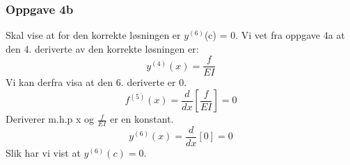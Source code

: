 \subsubsection{Oppgave 4b}
Skal vise at for den korrekte løsningen er $y^{(6)}$(c) = 0. Vi vet fra oppgave 4a at den 4. deriverte av den korrekte løsningen er:
\begin{equation*}
y^{(4)}(x) = \frac{f}{EI}
\end{equation*}
Vi kan derfra visa at den 6. deriverte er 0.
\begin{equation}
f^{(5)}(x) = \frac{d}{dx}[\frac{f}{EI}] = 0
\end{equation}
Deriverer m.h.p x og $\frac{f}{EI}$ er en konstant.
\begin{equation}
y^{(6)}(x) = \frac{d}{dx}[0] = 0
\end{equation}
Slik har vi vist at $y^{(6)}(c) = 0$.